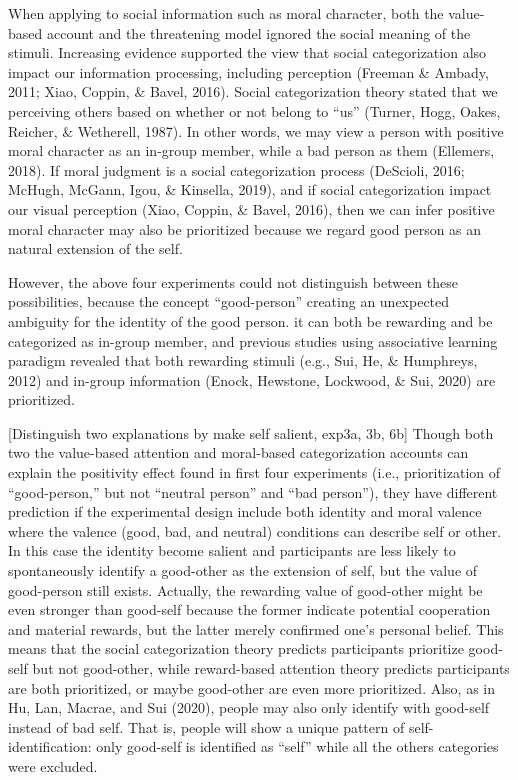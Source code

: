 \documentclass[
  english,
  man]{apa6}
\begin{document}
When applying to social information such as moral character, both the value-based account and the threatening model ignored the social meaning of the stimuli. Increasing evidence supported the view that social categorization also impact our information processing, including perception (Freeman \& Ambady, 2011; Xiao, Coppin, \& Bavel, 2016). Social categorization theory stated that we perceiving others based on whether or not belong to ``us'' (Turner, Hogg, Oakes, Reicher, \& Wetherell, 1987). In other words, we may view a person with positive moral character as an in-group member, while a bad person as them (Ellemers, 2018). If moral judgment is a social categorization process (DeScioli, 2016; McHugh, McGann, Igou, \& Kinsella, 2019), and if social categorization impact our visual perception (Xiao, Coppin, \& Bavel, 2016), then we can infer positive moral character may also be prioritized because we regard good person as an natural extension of the self.

However, the above four experiments could not distinguish between these possibilities, because the concept ``good-person'' creating an unexpected ambiguity for the identity of the good person. it can both be rewarding and be categorized as in-group member, and previous studies using associative learning paradigm revealed that both rewarding stimuli (e.g., Sui, He, \& Humphreys, 2012) and in-group information (Enock, Hewstone, Lockwood, \& Sui, 2020) are prioritized.

{[}Distinguish two explanations by make self salient, exp3a, 3b, 6b{]}
Though both two the value-based attention and moral-based categorization accounts can explain the positivity effect found in first four experiments (i.e., prioritization of ``good-person,'' but not ``neutral person'' and ``bad person''), they have different prediction if the experimental design include both identity and moral valence where the valence (good, bad, and neutral) conditions can describe self or other. In this case the identity become salient and participants are less likely to spontaneously identify a good-other as the extension of self, but the value of good-person still exists. Actually, the rewarding value of good-other might be even stronger than good-self because the former indicate potential cooperation and material rewards, but the latter merely confirmed one's personal belief. This means that the social categorization theory predicts participants prioritize good-self but not good-other, while reward-based attention theory predicts participants are both prioritized, or maybe good-other are even more prioritized. Also, as in Hu, Lan, Macrae, and Sui (2020), people may also only identify with good-self instead of bad self. That is, people will show a unique pattern of self-identification: only good-self is identified as ``self'' while all the others categories were excluded.
\end{document}
